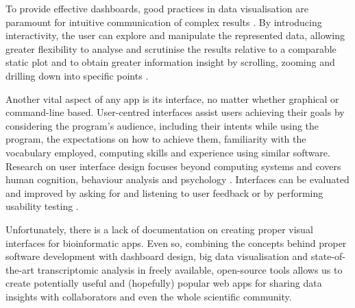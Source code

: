 To provide effective dashboards, good practices in data visualisation are paramount for intuitive communication of complex results \cite{tidwell:2019tf}. By introducing interactivity, the user can explore and manipulate the represented data, allowing greater flexibility to analyse and scrutinise the results relative to a comparable static plot and to obtain greater information insight by scrolling, zooming and drilling down into specific points \cite{tidwell:2019tf}.

Another vital aspect of any app is its interface, no matter whether graphical or command-line based. User-centred interfaces assist users achieving their goals by considering the program's audience, including their intents while using the program, the expectations on how to achieve them, familiarity with the vocabulary employed, computing skills and experience using similar software. Research on user interface design focuses beyond computing systems and covers human cognition, behaviour analysis and psychology \cite{silva:2017wl,hewitt:2019uj,tidwell:2019tf,alves:2020vu}. Interfaces can be evaluated and improved by asking for and listening to user feedback or by performing usability testing \cite{tidwell:2019tf}.

Unfortunately, there is a lack of documentation on creating proper visual interfaces for bioinformatic apps. Even so, combining the concepts behind proper software development with dashboard design, big data visualisation and state-of-the-art transcriptomic analysis in freely available, open-source tools allows us to create potentially useful and (hopefully) popular web apps for sharing data insights with collaborators and even the whole scientific community.
